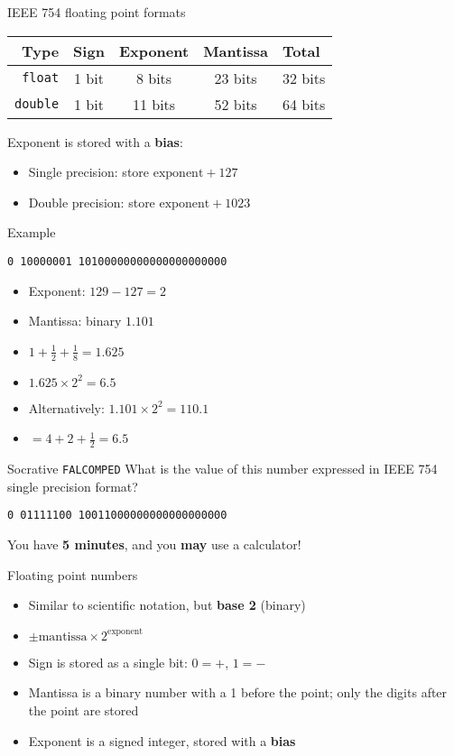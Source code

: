 \begin{frame}[fragile]{IEEE 754 floating point formats}
	\begin{center}
		\begin{tabular}{|r|ccc|l|}
			\hline
			Type & Sign & Exponent & Mantissa & Total \\\hline
			\lstinline{float} & 1 bit & 8 bits & 23 bits & 32 bits \\\hline
			\lstinline{double} & 1 bit & 11 bits & 52 bits & 64 bits \\\hline
		\end{tabular}
	\end{center}
	\pause
	Exponent is stored with a \textbf{bias}:
	\begin{itemize}
		\item Single precision: store $\text{exponent} + 127$
		\item Double precision: store $\text{exponent} + 1023$
	\end{itemize}
\end{frame}

\begin{frame}{Example}
	\pause
	\begin{center}
		\texttt{0 10000001 10100000000000000000000}
	\end{center}
	\begin{itemize}
		\pause\item Exponent: $129 - 127 = 2$
		\pause\item Mantissa: binary $1.101$
		\pause\item $1 + \frac12 + \frac18 = 1.625$
		\pause\item $1.625 \times 2^2 = 6.5$
		\pause\item Alternatively: $1.101 \times 2^2 = 110.1$
		\pause\item $= 4 + 2 + \frac12 = 6.5$
	\end{itemize}
\end{frame}

\begin{frame}{Socrative \texttt{FALCOMPED}}
	\pause
	What is the value of this number expressed in IEEE 754 single precision format?
	\begin{center}
		\texttt{0 01111100 10011000000000000000000}
	\end{center}
	You have \textbf{5 minutes}, and you \textbf{may} use a calculator!
\end{frame}

\begin{frame}{Floating point numbers}
	\begin{itemize}
		\pause\item Similar to scientific notation, but \textbf{base 2} (binary)
		\pause\item $\pm \text{mantissa} \times 2^{\text{exponent}}$
		\pause\item Sign is stored as a single bit: $0=+$, $1=-$
		\pause\item Mantissa is a binary number with a 1 before the point;
			only the digits after the point are stored
		\pause\item Exponent is a signed integer, stored with a \textbf{bias}
	\end{itemize}
\end{frame}

